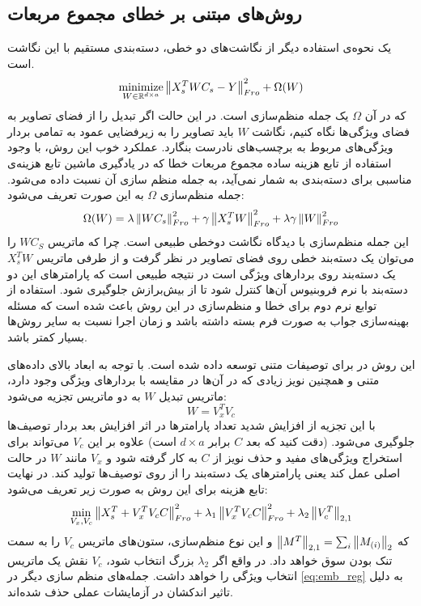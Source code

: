 \subsection{روش‌های مبتنی بر خطای مجموع مربعات} \label{mse_loss_methods}

یک نحوه‌ی استفاده دیگر از نگاشت‌های دو خطی، دسته‌بندی مستقیم با این نگاشت است.
\begin{equation}
\operatorname*{minimize}_{W \in \mathbb{R}^{d \times a}} \left \lVert X_s^T WC_s - Y \right \rVert_{Fro}^2 + \Omega(W) \label{eq:emb}
\end{equation}
که در آن $\Omega$ یک جمله منظم‌سازی است.
در این حالت اگر تبدیل را از فضای تصاویر به فضای ویژگی‌ها نگاه کنیم، نگاشت $W$ باید تصاویر را به زیرفضایی عمود به تمامی بردار ویژگی‌های مربوط به برچسب‌های نادرست بنگارد.
عملکرد خوب این روش، با وجود استفاده از تابع هزینه ساده مجموع مربعات خطا که در یادگیری ماشین تابع هزینه‌ی مناسبی برای دسته‌بندی به شمار نمی‌آید، به جمله منظم سازی آن نسبت داده می‌شود. جمله منظم‌سازی $\Omega$ به این صورت تعریف می‌شود:
\begin{equation} \label{eq:emb_reg}
\Omega(W) = \lambda \left \lVert WC_s \right \rVert_{Fro}^2 + \gamma \left \lVert X_s^T W \right \rVert_{Fro}^2  + \lambda \gamma \left \lVert W \right \rVert_{Fro}^2
\end{equation}
این جمله منظم‌سازی با دیدگاه نگاشت دوخطی طبیعی است. چرا که ماتریس $WC_S$ را می‌توان یک دسته‌بند خطی روی فضای تصاویر در نظر گرفت و از طرفی ماتریس $X_s^T W$ یک دسته‌بند روی بردارهای ویژگی است در نتیجه طبیعی است که پارامترهای این دو دسته‌بند با نرم فروبنیوس آن‌ها کنترل شود تا از بیش‌‌برازش
 جلوگیری شود.
استفاده از توابع نرم دوم برای خطا و منظم‌سازی در این روش باعث شده است که مسئله بهینه‌سازی جواب به صورت فرم بسته داشته باشد و زمان اجرا نسبت به سایر روش‌ها بسیار کمتر باشد.

این روش در
\cite{lessismore}
برای توصیفات متنی توسعه داده شده است. با توجه به ابعاد بالای داده‌های متنی و همچنین نویز زیادی که در آن‌ها در مقایسه با بردارهای ویژگی وجود دارد، ماتریس تبدیل $W$ به دو ماتریس تجزیه می‌شود:
\begin{equation}
W = V_x^T V_c
\end{equation}
با این تجزیه از افزایش شدید تعداد پارامترها در اثر افزایش بعد بردار توصیف‌ها جلوگیری می‌شود. (دقت کنید که بعد $C$ برابر $d\times a$ است) علاوه بر این $V_c$ می‌تواند برای استخراج ویژگی‌های مفید و حذف نویز از  $C$ به  کار گرفته شود و $V_x$ مانند $W$ در حالت اصلی عمل کند یعنی پارامترهای یک دسته‌بند را از روی توصیف‌ها تولید کند. در نهایت تابع هزینه برای این روش به صورت زیر تعریف می‌شود:
\begin{equation}
\min_{V_x, V_c} \left \lVert X_s^T + V_x^T V_c C \right \rVert_{Fro}^2 + \lambda_1 \left \lVert  V_x^T V_c C \right \rVert_{Fro}^2 +
\lambda_2 \left \lVert V_c^T \right \rVert_{2,1}
\end{equation}
که
$\left \lVert M^T \right \rVert_{2,1} = \sum_i \left \lVert M_{(i)} \right \rVert_2 $
و این نوع منظم‌سازی، ستون‌های ماتریس $V_c$ را به سمت تنک بودن سوق خواهد داد. در واقع اگر $\lambda_2$ بزرگ انتخاب شود، $V_c$ نقش یک ماتریس انتخاب ویژگی
را خواهد داشت. جمله‌های منظم سازی دیگر در
\eqref{eq:emb_reg}
به دلیل تاثیر اندکشان در آزمایشات عملی حذف شده‌اند.


